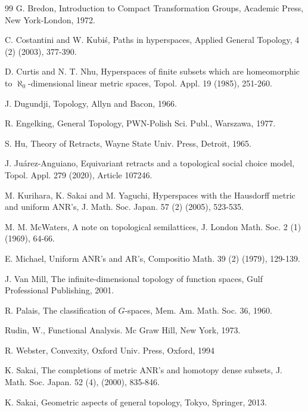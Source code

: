 \documentclass[12pt]{amsart}
\theoremstyle{definition}
\begin{document}
\begin{thebibliography}{99}
		 G. Bredon,  Introduction to Compact Transformation Groups, Academic Press, New York-London, 1972.
		
		 C. Costantini and W. Kubi\'s,  Paths in hyperspaces,  Applied General Topology, 4 (2)  (2003), 377-390.
		
		 D. Curtis and N. T. Nhu, Hyperspaces of finite subsets which are homeomorphic to $\aleph_0$-dimensional linear metric spaces, Topol. Appl. 19 (1985), 251-260.
				
		 J. Dugundji, Topology, Allyn and Bacon, 1966.
		
		 R. Engelking,  General Topology, PWN-Polish Sci. Publ., Warszawa, 1977.
				
		 S. Hu,  Theory of Retracts, Wayne State Univ. Press, Detroit, 1965. 
				
		 J. Juárez-Anguiano, Equivariant retracts and a topological social choice model, Topol. Appl. 279 (2020), Article 107246.
				
		 M. Kurihara, K. Sakai and M. Yaguchi,  Hyperspaces with the Hausdorff metric and uniform ANR’s, J. Math. Soc. Japan. 57 (2) (2005), 523-535.
				
		 M. M. McWaters, A note on topological semilattices, J. London Math. Soc. 2 (1) (1969), 64-66.
				
		 E. Michael, Uniform ANR's and AR's, Compositio Math. 39 (2) (1979), 129-139.
				
		 J. Van Mill, The infinite-dimensional topology of function spaces, Gulf Professional Publishing, 2001.
		
		
		 R. Palais, The classification of  $G$-spaces, Mem. Am. Math. Soc. 36, 1960.
				
		
		 Rudin, W.,  Functional Analysis. Mc Graw Hill, New York, 1973.
		
		 R. Webster, Convexity, Oxford Univ. Press, Oxford, 1994
		
		 K. Sakai, The completions of metric ANR's and homotopy dense subsets, J. Math. Soc. Japan. 52 (4), (2000), 835-846.
				
		 K. Sakai,  Geometric aspects of general topology, Tokyo, Springer, 2013. 
				

\end{thebibliography}
\end{document}
